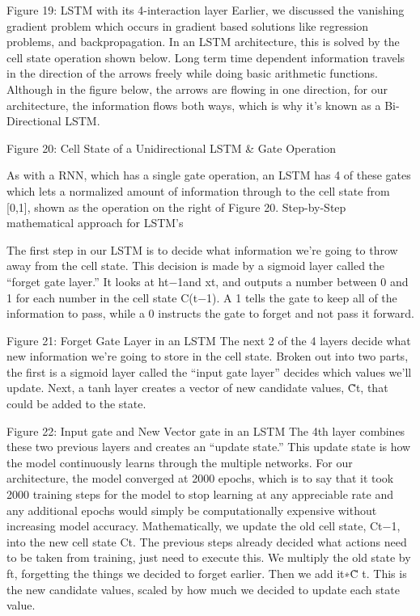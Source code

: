 \documentclass{article}
\begin{document}
 
Figure 19: LSTM with its 4-interaction layer
Earlier, we discussed the vanishing gradient problem which occurs in gradient based solutions like regression problems, and backpropagation. In an LSTM architecture, this is solved by the cell state operation shown below. Long term time dependent information travels in the direction of the arrows freely while doing basic arithmetic functions. Although in the figure below, the arrows are flowing in one direction, for our architecture, the information flows both ways, which is why it’s known as a Bi-Directional LSTM.

Figure 20: Cell State of a Unidirectional LSTM & Gate Operation

As with a RNN, which has a single gate operation, an LSTM has 4 of these gates which lets a normalized amount of information through to the cell state from [0,1], shown as the operation on the right of Figure 20. 
Step-by-Step mathematical approach for LSTM’s

The first step in our LSTM is to decide what information we’re going to throw away from the cell state. This decision is made by a sigmoid layer called the “forget gate layer.” It looks at ht−1and xt, and outputs a number between 0 and 1 for each number in the cell state C(t−1). A 1 tells the gate to keep all of the information to pass, while a 0 instructs the gate to forget and not pass it forward. 

Figure 21: Forget Gate Layer in an LSTM
The next 2 of the 4 layers decide what new information we’re going to store in the cell state. Broken out into two parts, the first is a sigmoid layer called the “input gate layer” decides which values we’ll update. Next, a tanh layer creates a vector of new candidate values, C̃t, that could be added to the state. 

Figure 22: Input gate and New Vector gate in an LSTM
The 4th layer combines these two previous layers and creates an “update state.” This update state is how the model continuously learns through the multiple networks. For our architecture, the model converged at 2000 epochs, which is to say that it took 2000 training steps for the model to stop learning at any appreciable rate and any additional epochs would simply be computationally expensive without increasing model accuracy. Mathematically, we update the old cell state, Ct−1, into the new cell state Ct. The previous steps already decided what actions need to be taken from training, just need to execute this. We multiply the old state by ft, forgetting the things we decided to forget earlier. Then we add it∗C̃ t. This is the new candidate values, scaled by how much we decided to update each state value.
\end{document}
